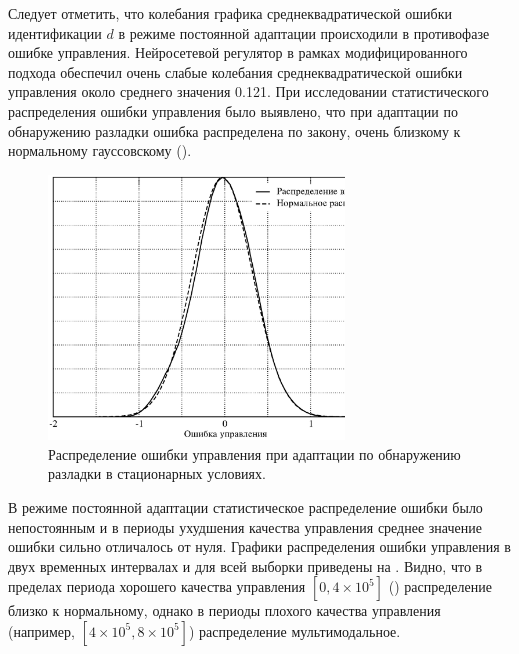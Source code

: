 Следует отметить, что колебания графика среднеквадратической ошибки
идентификации $d$ в режиме постоянной адаптации происходили в
противофазе ошибке управления.  Нейросетевой регулятор в рамках
модифицированного подхода обеспечил очень слабые колебания
среднеквадратической ошибки управления около среднего значения 0.121.
При исследовании статистического распределения ошибки управления было
выявлено, что при адаптации по обнаружению разладки ошибка
распределена по закону, очень близкому к нормальному гауссовскому
().

\begin{figure}[h]
\centering
\includegraphics[width=0.7\textwidth,%
  totalheight=0.3\textheight]{modif_apr_distrib_rus}
\caption{Распределение ошибки управления при адаптации по обнаружению
  разладки в стационарных условиях.}
\label{fig:modif_apr_distrib_rus}
\end{figure}

В режиме постоянной адаптации статистическое распределение ошибки было
непостоянным и в периоды ухудшения качества управления среднее
значение ошибки сильно отличалось от нуля.  Графики распределения
ошибки управления в двух временных интервалах и для всей выборки
приведены на .  Видно, что в
пределах периода хорошего качества управления $[0, 4\times10^5]$
() распределение близко к нормальному,
однако в периоды плохого качества управления (например, $[4\times10^5,
  8\times10^5]$) распределение мультимодальное.

